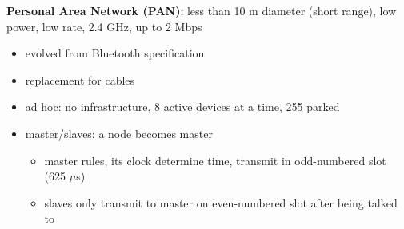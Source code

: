 \documentclass[11pt]{article}
\begin{document}
\textbf{Personal Area Network (PAN)}: less than 10 m diameter (short range), low power, low rate, 2.4 GHz,
up to 2 Mbps
\begin{itemize}
\item evolved from Bluetooth specification
\item replacement for cables
\item ad hoc: no infrastructure, 8 active devices at a time, 255 parked
\item master/slaves: a node becomes master
\begin{itemize}
\item master rules, its clock determine time, transmit in odd-numbered slot (625 \(\mu\)s)
\item slaves only transmit to master on even-numbered slot after being talked to
\end{itemize}
\end{itemize}
\end{document}
